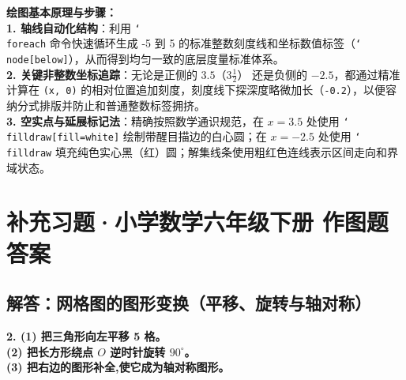\documentclass[12pt, a4paper]{ctexrep}
\begin{document}
{\small\color{blue!70!black}
\textbf{绘图基本原理与步骤：}\\
\textbf{1. 轴线自动化结构}：利用 \texttt{\char`\\foreach} 命令快速循环生成 -5 到 5 的标准整数刻度线和坐标数值标签（\texttt{\char`\\node[below]}），从而得到均匀一致的底层度量标准体系。\\
\textbf{2. 关键非整数坐标追踪}：无论是正侧的 $3.5$（$3\frac{1}{2}$） 还是负侧的 $-2.5$，都通过精准计算在 \texttt{(x, 0)} 的相对位置追加刻度，刻度线下探深度略微加长（\texttt{-0.2}），以便容纳分式排版并防止和普通整数标签拥挤。\\
\textbf{3. 空实点与延展标记法}：精确按照数学通识规范，在 $x=3.5$ 处使用 \texttt{\char`\\filldraw[fill=white]} 绘制带醒目描边的白心圆；在 $x=-2.5$ 处使用 \texttt{\char`\\filldraw} 填充纯色实心黑（红）圆；解集线条使用粗红色连线表示区间走向和界域状态。
}

\newpage

\chapter{补充习题·小学数学六年级下册 作图题答案}

\vspace{0.8cm}

\section{解答：网格图的图形变换（平移、旋转与轴对称）}

\vspace{0.4cm}

\noindent\textbf{2. (1) 把三角形向左平移 5 格。}\\
\noindent\textbf{   (2) 把长方形绕点 $O$ 逆时针旋转 $90^{\circ}$。}\\
\noindent\textbf{   (3) 把右边的图形补全,使它成为轴对称图形。}

\vspace{1.2cm}
\end{document}
